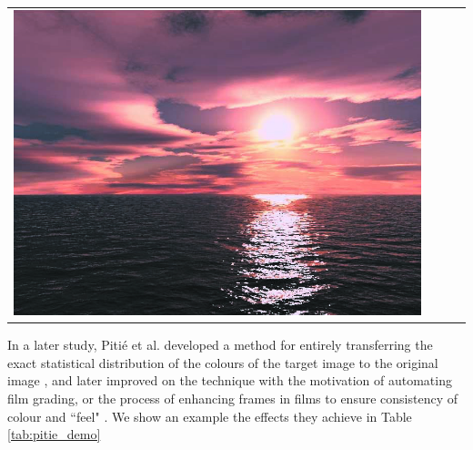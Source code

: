 \begin{longtable}{|N||c|c|c|}
  \begin{minipage}{.29\textwidth}
    \includegraphics[width=\textwidth,height=\textheight,keepaspectratio]{images/reinhard_result1}
  \end{minipage} \\
\end{longtable}

In a later study, Piti\'{e} et al. developed a method for entirely transferring the exact statistical distribution of the colours of the target image to the original image \cite{pitie_2005_pdf}, and later improved on the technique with the motivation of automating film grading, or the process of enhancing frames in films to ensure consistency of colour and ``feel" \cite{pitie_2007_grading}. We show an example the effects they achieve in Table \ref{tab:pitie_demo}

